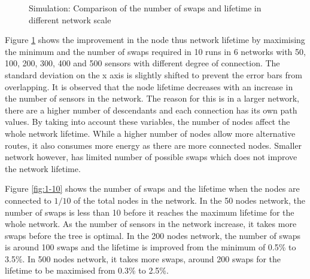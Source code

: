 \begin{figure}
\centering
\caption{Simulation: Comparison of the number of swaps and lifetime in different network scale}
\label{fig:maxmin}
\end{figure}


Figure \ref{fig:maxmin} shows the improvement in the node thus network lifetime by maximising the minimum and the number of swaps required in 10 runs in 6 networks with 50, 100, 200, 300, 400 and 500 sensors with different degree of connection. 
The standard deviation on the x axis is slightly shifted to prevent the error bars from overlapping.
It is observed that the node lifetime decreases with an increase in the number of sensors in the network. The reason for this is in a larger network, there are a higher number of descendants and each connection has its own path values. By taking into account these variables, the number of nodes affect the whole network lifetime. While a higher number of nodes allow more alternative routes, it also consumes more energy as there are more connected nodes. Smaller network however, has limited number of possible swaps which does not improve the network lifetime.

Figure \ref{fig:1-10} shows the number of swaps and the lifetime when the nodes are connected to $1/10$ of the total nodes in the network. 
In the 50 nodes network, the number of swaps is less than 10 before it reaches the maximum lifetime for the whole network. 
As the number of sensors in the network increase, it takes more swaps before the tree is optimal. 
In the 200 nodes network, the number of swaps is around 100 swaps and the lifetime is improved from the minimum of 0.5\% to 3.5\%. In 500 nodes network, it takes more swaps, around 200 swaps for the lifetime to be maximised from 0.3\% to 2.5\%. 

